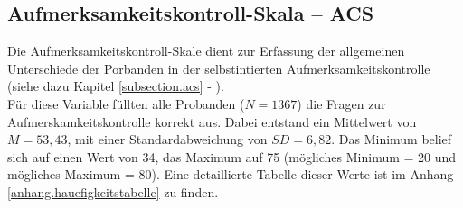 \subsection{Aufmerksamkeitskontroll-Skala -- ACS}
Die Aufmerksamkeitskontroll-Skale dient zur Erfassung der allgemeinen Unterschiede der Porbanden in der selbstintierten Aufmerksamkeitskontrolle (siehe dazu Kapitel \ref{subsection.acs} - ). \\ Für diese Variable füllten alle Probanden ($N=1367$) die Fragen zur Aufmerskamkeitskontrolle korrekt aus. Dabei entstand ein Mittelwert von $M = 53,43$, mit einer Standardabweichung von $SD = 6,82$. Das Minimum belief sich auf einen Wert von 34, das Maximum auf 75 (mögliches Minimum = 20 und mögliches Maximum = 80). Eine detaillierte Tabelle dieser Werte ist im Anhang \ref{anhang.hauefigkeitstabelle} zu finden.

